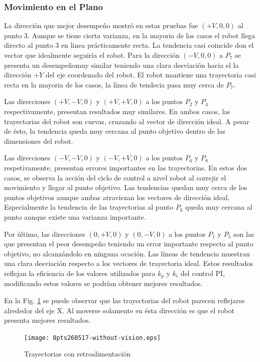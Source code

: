 \documentclass[twocolumn,10pt]{amrob}
\begin{document}
\subsubsection*{Movimiento en el Plano}
La dirección que mejor desempeño mostró en estas pruebas fue $(+V, 0, 0)$ al punto 3. Aunque se tiene cierta varianza, en la mayoria de los casos el robot llega directo al punto 3 en linea prácticamente recta. La tendencia casi coincide don el vector que idealmente seguiría el robot. Para la dirección $(-V, 0, 0)$ a $P_7$ se presenta un desempeñomuy similar teniendo una clara desviación hacia el la dirección $+Y$ del eje coordenado del robot. El robot mantiene una trayectoria casi recta en la mayoria de los casos, la línea de tendecia pasa muy cerca de $P_7$.
\par
Las direcciones $(+V, -V, 0)$ y $(+V, +V, 0)$ a los puntos $P_2$ y $P_4$ respectivamente, presentan resultados muy similares. En ambos casos, las trayectorias del robot son curvas, cruzando al vector de dirección ideal. A pesar de ésto, la tendencia queda muy cercana al punto objetivo dentro de las dimensiones del robot. \par
Las direcciones $(-V, -V, 0)$ y $(-V, +V, 0)$ a los puntos $P_6$ y $P_8$ respetivamente, presentan errores importantes en las trayectorias. En estos dos casos, se observa la acción del ciclo de control a nivel robot al correjir el movimiento y llegar al punto objetivo. Las tendencias quedan muy cerca de los puntos objetivos aunque ambas atraviezan los vectores de dirección ideal. Especialmente la tendencia de las trayectorias al punto $P_6$ queda muy cercana al punto aunque existe una varianza importante. 
\par
Por último, las direcciones $(0, +V, 0)$ y $(0, -V, 0)$ a los puntos $P_1$ y $P_5$ son las que presentan el peor desempeño teniendo un error importante respecto al punto objetivo, no alcanzándolo en ninguna ocación. Las líneas de tendencia muestran una clara desviación respecto a los vectores de trayectoria ideal. Estos resultados reflejan la eficiencia de los valores utilizados para $k_p$ y $k_i$ del control PI, modificando estos valores se podrían obtener mejores resultados. 
\par
En la Fig. \ref{fig:8pts_without_vision} se puede observar que las trayectorias del robot parecen reflejarse alrededor del eje X. Al moverse solamente en ésta dirección es que el robot presenta mejores resultados. 
\par
\begin{figure}
  \centering
    \texttt{[image: 8pts260517-without-vision.eps]}
  \caption{Trayectorias con retroalimentación}
  \label{fig:8pts_without_vision}
\end{figure}
\end{document}
